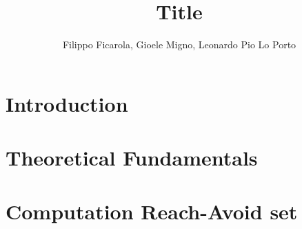 \documentclass[conference]{IEEEtran}
\begin{document}
    
    \title{\LARGE Title}
    \author{Filippo Ficarola, Gioele Migno, Leonardo Pio Lo Porto}
    \maketitle
    
    
    
    \section{Introduction}
        
    
    \section{Theoretical Fundamentals}
        
    
    \section{Computation Reach-Avoid set}
        

\begin{comment}        
    \section{Problem Formulation}
        
    
    \section{Case of Study}
        

    \section{Simulation}
        
        
    \section{Conclusion}
        
\end{comment}
    
\end{document}
